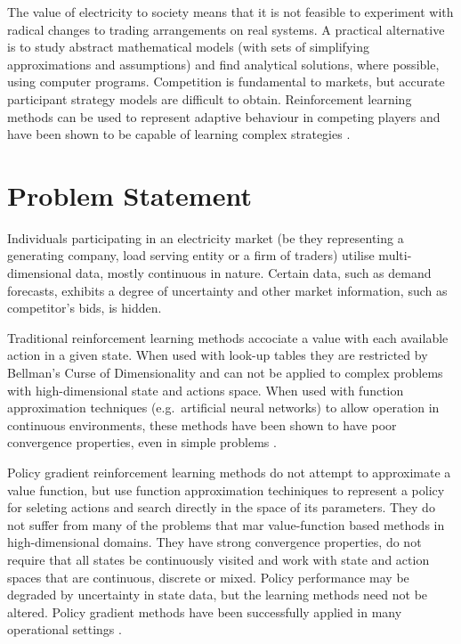 The value of electricity to society
means that it is not feasible to experiment with radical changes to trading
arrangements on real systems.  A practical alternative is to study abstract
mathematical models (with sets of simplifying approximations and assumptions)
and find analytical solutions, where possible, using
computer programs.  Competition is fundamental to markets, but accurate
participant strategy models are difficult to obtain.  Reinforcement
learning methods can be used to represent adaptive behaviour in competing
players and have been shown to be capable of learning complex strategies
\cite{tesauro:gammon}.

\section{Problem Statement}%
Individuals participating in an electricity market (be they representing a
generating company, load serving entity or a firm of traders) utilise
multi-dimensional data, mostly continuous in nature.  Certain data, such
as demand forecasts, exhibits a degree of uncertainty and other market
information, such as competitor's bids, is hidden.

Traditional reinforcement learning methods accociate a value with each
available action in a given state.  When used with look-up tables they are
restricted by Bellman's Curse of Dimensionality \cite{bellman:1961} and can
not be applied to complex problems with high-dimensional state and actions
space.  When used with function approximation techniques (e.g.~artificial
neural networks) to allow operation in continuous environments, these methods
have been shown to have poor convergence properties, even in simple problems
\cite{gordon:95,baird:95,tsitsiklis:94}.

Policy gradient reinforcement learning methods do not attempt to
approximate a value function, but use function approximation techiniques to
represent a policy for seleting actions and search directly in the space of
its parameters.  They do not suffer from many of the problems that
mar value-function based methods in high-dimensional domains.  They have
strong convergence properties, do not require that all states be continuously
visited and work with state and action spaces that are continuous, discrete or
mixed.  Policy performance may be degraded by uncertainty in state data, but
the learning methods need not be altered.  Policy gradient methods have been
successfully applied in many operational settings
\cite{barto:policy,shaal:robots,moody:direct,peshkin:routing}.


